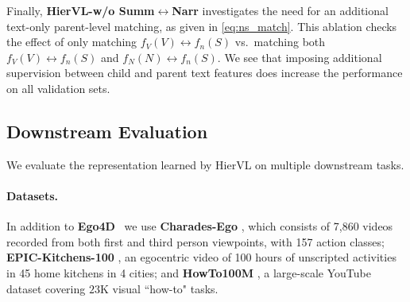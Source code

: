 \documentclass[10pt,twocolumn,letterpaper]{article}
\newcommand{\modelname}[0]{{HierVL}}
\begin{document}
Finally, \textbf{\modelname-w/o Summ$\leftrightarrow$Narr} investigates the need for an additional text-only parent-level matching, as given in \cref{eq:ns_match}. This ablation checks the effect of only matching $f_V(V) \leftrightarrow f_n(S)$ vs.~matching both $f_V(V) \leftrightarrow f_n(S)$ and $f_N(N) \leftrightarrow f_n(S)$. We see that imposing additional supervision between child and parent text features does increase the performance on all validation sets. 






\subsection{Downstream Evaluation}
\label{sec:exp-downstream}

We evaluate the representation learned by \modelname{} on  multiple downstream tasks.
 
\vspace*{-0.15in}
\paragraph{Datasets.}  In addition to \textbf{Ego4D}~\cite{ego4d} we use 
\textbf{Charades-Ego} \cite{charades-ego}, which consists of 7,860 videos recorded from both first and third person viewpoints, with 157 action classes; \textbf{EPIC-Kitchens-100} \cite{epic-kitchens-100,epic-ijcv}, an egocentric video of 100 hours of unscripted activities in 45 home kitchens in 4 cities; and \textbf{HowTo100M} \cite{howto100m}, a large-scale YouTube dataset covering $23$K visual ``how-to" tasks. 
\end{document}
